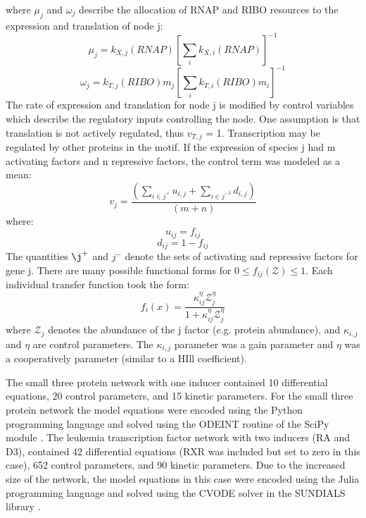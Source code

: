 \documentclass[12pt]{article}
\begin{document}
where $\mu_{j}$ and $\omega_{j}$ describe the allocation of RNAP and RIBO resources to the expression and translation of node j:
\begin{equation}\label{}
\mu_{j} = k_{X,j}(RNAP)\left[\sum_{i}k_{X,i}(RNAP)\right]^{-1} 
\end{equation}
\begin{equation}\label{}
\omega_{j} = k_{T,j}(RIBO)m_{j}\left[\sum_{i}k_{T,i}(RIBO)m_{i}\right]^{-1}
\end{equation}
The rate of expression and translation for node j is modified by control variables which describe the regulatory inputs controlling the node. One assumption is that translation is not actively regulated, thus $v_{T,j}$ = 1. Transcription may be regulated by other proteins in the motif. If the expression of species j had m activating factors and n repressive factors, the control term was modeled as a mean:
\begin{equation}\label{}
v_{j} = \frac{\left(\sum\limits_{i\in{j^{+}}}u_{i,j} + \sum\limits_{i\in{j^{-1}}}d_{i,j}\right)}{(m+n)}
\end{equation}
where:
\begin{equation}\label{}
u_{ij} = f_{ij} 
\end{equation}
\begin{equation}\label{}
d_{ij} = 1 - f_{ij}
\end{equation}
The quantities $\j^{+}$ and $j^{-}$ denote the sets of activating and repressive factors for gene j.
There are many possible functional forms for $0 \leq f_{ij}(\mathcal{Z}) \leq 1$. 
Each individual transfer function took the form:
\begin{equation}\label{transferfunction}
f_{i}(x) = \frac{\kappa_{ij}^{\eta}\mathcal{Z}_{j}^{\eta}}{1+\kappa_{ij}^{\eta}\mathcal{Z}_{j}^{\eta}}
\end{equation}
where $\mathcal{Z}_{j}$ denotes the abundance of the j factor (e.g. protein abundance), and $\kappa_{i,j}$ and $\eta$ are control parameters. The $\kappa_{i,j}$ parameter was a gain parameter and $\eta$ was a cooperatively parameter (similar to a HIll coefficient). 

The small three protein network with one inducer contained 10 differential equations, 20 control parameters, and 15 kinetic parameters. 
For the small three protein network the model equations were encoded using the Python programming language and solved using the ODEINT routine of the SciPy module \cite{Jones2001}. 
The leukemia transcription factor network with two inducers (RA and D3), contained 42 differential equations (RXR was included but set to zero in this case), 652 control parameters, and 90 kinetic parameters. 
Due to the increased size of the network, the model equations in this case were encoded using the Julia programming language \cite{BEKS14} and solved using the CVODE solver in the SUNDIALS library \cite{Hindmarsh2005}.
\end{document}
